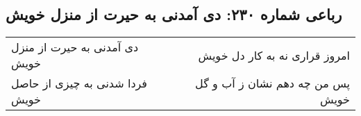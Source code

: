 \begin{center}
\section*{رباعی شماره ۲۳۰: دی آمدنی به حیرت از منزل خویش}
\label{sec:sh230}
\begin{longtable}{l p{0.5cm} r}
دی آمدنی به حیرت از منزل خویش
&&
امروز قراری نه به کار دل خویش
\\
فردا شدنی به چیزی از حاصل خویش
&&
پس من چه دهم نشان ز آب و گل خویش
\\
\end{longtable}
\end{center}

